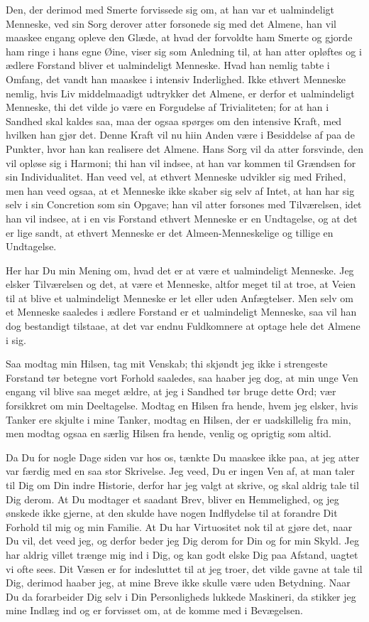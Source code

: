 \documentclass[12pt,a4paper]{article}
\begin{document}
Den, der derimod med Smerte forvissede sig om, at han var et ualmindeligt Menneske, ved sin Sorg derover atter forsonede sig med det Almene, han vil maaskee engang opleve den Glæde, at hvad der forvoldte ham Smerte og gjorde ham ringe i hans egne Øine, viser sig som Anledning til, at han atter opløftes og i ædlere Forstand bliver et ualmindeligt Menneske. Hvad han nemlig tabte i Omfang, det vandt han maaskee i intensiv Inderlighed. Ikke ethvert Menneske nemlig, hvis Liv middelmaadigt udtrykker det Almene, er derfor et ualmindeligt Menneske, thi det vilde jo være en Forgudelse af Trivialiteten; for at han i Sandhed skal kaldes saa, maa der ogsaa spørges om den intensive Kraft, med hvilken han gjør det. Denne Kraft vil nu hiin Anden være i Besiddelse af paa de Punkter, hvor han kan realisere det Almene. Hans Sorg vil da atter forsvinde, den vil opløse sig i Harmoni; thi han vil indsee, at han var kommen til Grændsen for sin Individualitet. Han veed vel, at ethvert Menneske udvikler sig med Frihed, men han veed ogsaa, at et Menneske ikke skaber sig selv af Intet, at han har sig selv i sin Concretion som sin Opgave; han vil atter forsones med Tilværelsen, idet han vil indsee, at i en vis Forstand ethvert Menneske er en Undtagelse, og at det er lige sandt, at ethvert Menneske er det Almeen-Menneskelige og tillige en Undtagelse.

Her har Du min Mening om, hvad det er at være et ualmindeligt Menneske. Jeg elsker Tilværelsen og det, at være et Menneske, altfor meget til at troe, at Veien til at blive et ualmindeligt Menneske er let eller uden Anfægtelser. Men selv om et Menneske saaledes i ædlere Forstand er et ualmindeligt Menneske, saa vil han dog bestandigt tilstaae, at det var endnu Fuldkomnere at optage hele det Almene i sig.

Saa modtag min Hilsen, tag mit Venskab; thi skjøndt jeg ikke i strengeste Forstand tør betegne vort Forhold saaledes, saa haaber jeg dog, at min unge Ven engang vil blive saa meget ældre, at jeg i Sandhed tør bruge dette Ord; vær forsikkret om min Deeltagelse. Modtag en Hilsen fra hende, hvem jeg elsker, hvis Tanker ere skjulte i mine Tanker, modtag en Hilsen, der er uadskillelig fra min, men modtag ogsaa en særlig Hilsen fra hende, venlig og oprigtig som altid.

Da Du for nogle Dage siden var hos os, tænkte Du maaskee ikke paa, at jeg atter var færdig med en saa stor Skrivelse. Jeg veed, Du er ingen Ven af, at man taler til Dig om Din indre Historie, derfor har jeg valgt at skrive, og skal aldrig tale til Dig derom. At Du modtager et saadant Brev, bliver en Hemmelighed, og jeg ønskede ikke gjerne, at den skulde have nogen Indflydelse til at forandre Dit Forhold til mig og min Familie. At Du har Virtuositet nok til at gjøre det, naar Du vil, det veed jeg, og derfor beder jeg Dig derom for Din og for min Skyld. Jeg har aldrig villet trænge mig ind i Dig, og kan godt elske Dig paa Afstand, uagtet vi ofte sees. Dit Væsen er for indesluttet til at jeg troer, det vilde gavne at tale til Dig, derimod haaber jeg, at mine Breve ikke skulle være uden Betydning. Naar Du da forarbeider Dig selv i Din Personligheds lukkede Maskineri, da stikker jeg mine Indlæg ind og er forvisset om, at de komme med i Bevægelsen.
\end{document}
